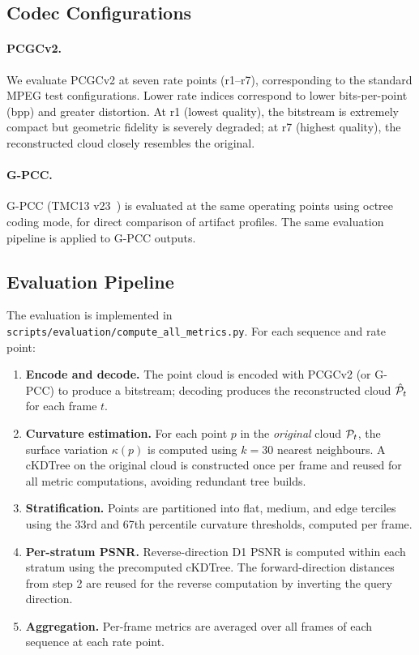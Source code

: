 \subsection{Codec Configurations}

\paragraph{PCGCv2.}
We evaluate PCGCv2 at seven rate points (r1--r7), corresponding to the
standard MPEG test configurations.
Lower rate indices correspond to lower bits-per-point (bpp) and greater
distortion.
At r1 (lowest quality), the bitstream is extremely compact but geometric
fidelity is severely degraded; at r7 (highest quality), the reconstructed
cloud closely resembles the original.

\paragraph{G-PCC.}
G-PCC (TMC13 v23~\cite{mpeg2023tmc13}) is evaluated at the same operating
points using octree coding mode, for direct comparison of artifact profiles.
The same evaluation pipeline is applied to G-PCC outputs.

\subsection{Evaluation Pipeline}

The evaluation is implemented in
\texttt{scripts/evaluation/compute\_all\_metrics.py}.
For each sequence and rate point:

\begin{enumerate}
  \item \textbf{Encode and decode.}
    The point cloud is encoded with PCGCv2 (or G-PCC) to produce a bitstream;
    decoding produces the reconstructed cloud $\hat{\mathcal{P}}_t$ for each frame $t$.

  \item \textbf{Curvature estimation.}
    For each point $p$ in the \emph{original} cloud $\mathcal{P}_t$, the surface
    variation $\kappa(p)$ is computed using $k = 30$ nearest neighbours.
    A cKDTree on the original cloud is constructed once per frame and reused
    for all metric computations, avoiding redundant tree builds.

  \item \textbf{Stratification.}
    Points are partitioned into flat, medium, and edge terciles using the
    33rd and 67th percentile curvature thresholds, computed per frame.

  \item \textbf{Per-stratum PSNR.}
    Reverse-direction D1 PSNR is computed within each stratum using the
    precomputed cKDTree.
    The forward-direction distances from step 2 are reused for the reverse
    computation by inverting the query direction.

  \item \textbf{Aggregation.}
    Per-frame metrics are averaged over all frames of each sequence at each
    rate point.
\end{enumerate}

